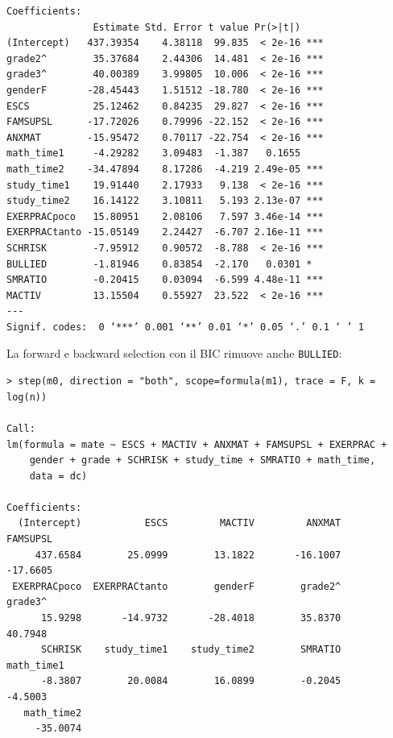 \documentclass{beamer}
\begin{document}
\begin{frame}[fragile]

{\tiny
\begin{verbatim}
Coefficients:
               Estimate Std. Error t value Pr(>|t|)    
(Intercept)   437.39354    4.38118  99.835  < 2e-16 ***
grade2^        35.37684    2.44306  14.481  < 2e-16 ***
grade3^        40.00389    3.99805  10.006  < 2e-16 ***
genderF       -28.45443    1.51512 -18.780  < 2e-16 ***
ESCS           25.12462    0.84235  29.827  < 2e-16 ***
FAMSUPSL      -17.72026    0.79996 -22.152  < 2e-16 ***
ANXMAT        -15.95472    0.70117 -22.754  < 2e-16 ***
math_time1     -4.29282    3.09483  -1.387   0.1655    
math_time2    -34.47894    8.17286  -4.219 2.49e-05 ***
study_time1    19.91440    2.17933   9.138  < 2e-16 ***
study_time2    16.14122    3.10811   5.193 2.13e-07 ***
EXERPRACpoco   15.80951    2.08106   7.597 3.46e-14 ***
EXERPRACtanto -15.05149    2.24427  -6.707 2.16e-11 ***
SCHRISK        -7.95912    0.90572  -8.788  < 2e-16 ***
BULLIED        -1.81946    0.83854  -2.170   0.0301 *  
SMRATIO        -0.20415    0.03094  -6.599 4.48e-11 ***
MACTIV         13.15504    0.55927  23.522  < 2e-16 ***
---
Signif. codes:  0 ‘***’ 0.001 ‘**’ 0.01 ‘*’ 0.05 ‘.’ 0.1 ‘ ’ 1
\end{verbatim}
}
\end{frame}


\begin{frame}[fragile]
La forward e backward selection con il BIC %
rimuove anche \texttt{BULLIED}:
{\tiny
\begin{verbatim}
> step(m0, direction = "both", scope=formula(m1), trace = F, k = log(n))

Call:
lm(formula = mate ~ ESCS + MACTIV + ANXMAT + FAMSUPSL + EXERPRAC + 
    gender + grade + SCHRISK + study_time + SMRATIO + math_time, 
    data = dc)

Coefficients:
  (Intercept)           ESCS         MACTIV         ANXMAT       FAMSUPSL  
     437.6584        25.0999        13.1822       -16.1007       -17.6605  
 EXERPRACpoco  EXERPRACtanto        genderF        grade2^        grade3^  
      15.9298       -14.9732       -28.4018        35.8370        40.7948  
      SCHRISK    study_time1    study_time2        SMRATIO     math_time1  
      -8.3807        20.0084        16.0899        -0.2045        -4.5003  
   math_time2  
     -35.0074  
\end{verbatim}
}
\end{frame}
\end{document}
